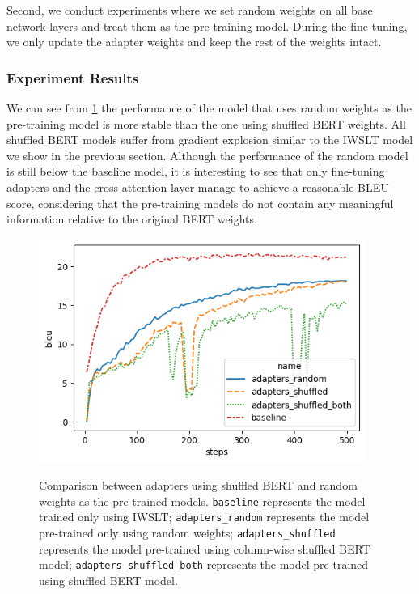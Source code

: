 Second, we conduct experiments where we set random weights on all base network layers and treat them as the pre-training model. During the fine-tuning, we only update the adapter weights and keep the rest of the weights intact.

\subsubsection{Experiment Results}
We can see from \cref{img:shfrndcmp} the performance of the model that uses random weights as the pre-training model is more stable than the one using shuffled BERT weights. All shuffled BERT models suffer from gradient explosion similar to the IWSLT model we show in the previous section. Although the performance of the random model is still below the baseline model, it is interesting to see that only fine-tuning adapters and the cross-attention layer manage to achieve a reasonable BLEU score, considering that the pre-training models do not contain any meaningful information relative to the original BERT weights.
\begin{figure}[h]
    {\includegraphics[width=0.95\textwidth]{img/randomshuffled.png}}
    \centering
    \caption{Comparison between adapters using shuffled BERT and random weights as the pre-trained models. \texttt{baseline} represents the model trained only using IWSLT; \texttt{adapters\_random} represents the model pre-trained only using random weights; \texttt{adapters\_shuffled} represents the model pre-trained using column-wise shuffled BERT model; \texttt{adapters\_shuffled\_both} represents the model pre-trained using shuffled BERT model.}
    \label{img:shfrndcmp}
\end{figure}

